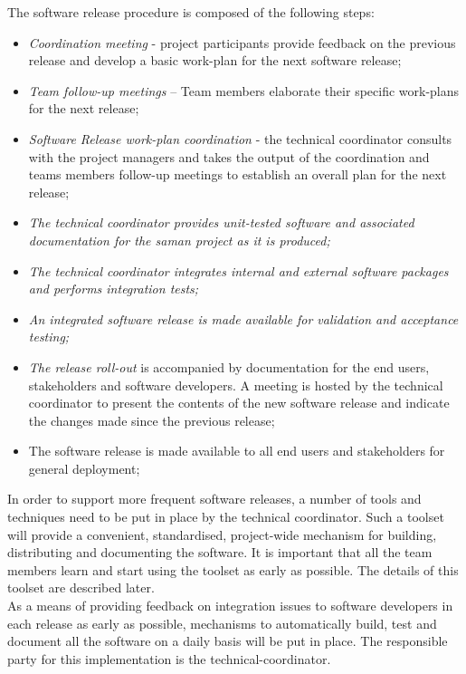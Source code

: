 \noindent The software release procedure is composed of the following steps:
\begin{itemize}
\item \textit{Coordination meeting} - project participants provide feedback on the previous release and develop a basic work-plan for the next software release;  
\item \textit{Team follow-up meetings} – Team members elaborate their specific work-plans for the next release;
\item \textit{Software Release work-plan coordination} - the technical coordinator consults with the project managers and takes the output of the coordination and teams members follow-up meetings to establish an overall plan for the next release;
\item \textit{The technical coordinator provides unit-tested software and associated documentation for the saman project as it is produced;}
\item \textit{The technical coordinator integrates internal and external software packages and performs integration tests;}
\item \textit{An integrated software release is made available for validation and acceptance testing;}
\item \textit{The release roll-out} is accompanied by documentation for the end users, stakeholders and software developers. A meeting is hosted by the technical coordinator to present the contents of the new software release and indicate the changes made since the previous release;
\item The software release is made available to all end users and stakeholders for general deployment; 
\end{itemize}
In order to support more frequent software releases, a number of tools and techniques need to be put in place by the technical coordinator. Such a toolset will provide a convenient, standardised, project-wide mechanism for building, distributing and documenting the software. It is important that all the team members learn and start using the toolset as early as possible. The details of this toolset are described later.\\

\noindent As a means of providing feedback on integration issues to software developers in each release as early as possible, mechanisms to automatically build, test and document all the software on a daily basis will be put in place. The responsible party for this implementation is the technical-coordinator.\\

